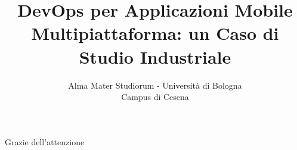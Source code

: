 \documentclass[10pt]{beamer}
\title[]{DevOps per Applicazioni Mobile Multipiattaforma: un Caso di Studio Industriale}
\institute[]{Laboratorio di Sistemi Software}
\author[Filippo Paganelli]{Alma Mater Studiorum - Università di Bologna \\ Campus di Cesena}
\date[\textcolor{white}{A.A. 21/22}]
{
\begin{columns}[onlytextwidth]
    \begin{column}{0.5\textwidth}
        \begin{flushleft}
            Relatore:\\
            \textbf{Prof. Danilo Pianini}\\
            \vspace{3mm}
            Correlatore:\\
            \textbf{Prof.ssa Catia Prandi}
        \end{flushleft}
    \end{column}
        \begin{column}{0.5\textwidth}
        \begin{flushright}
            Presentata da:\\
            \textbf{Filippo Paganelli}
        \end{flushright}
    \end{column}
\end{columns}
\vspace{10mm}
A.A. 21/22 \\ II Sessione
}
\begin{document}
\frame{\titlepage}







\begin{frame}
    \begin{center}
        \LARGE Grazie dell'attenzione
    \end{center}
\end{frame}
\end{document}
